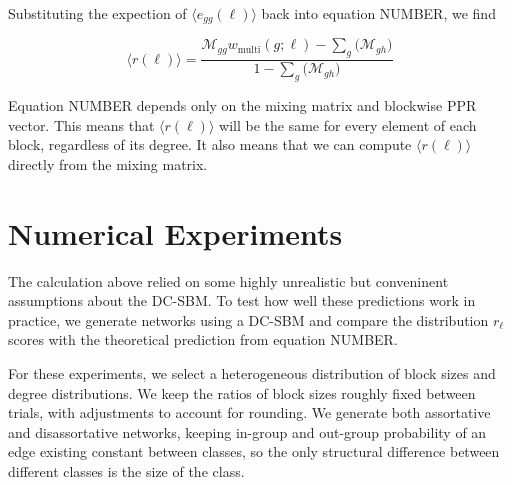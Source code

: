 \documentclass[12pt]{article}
\begin{document}
Substituting the expection of $\langle e_{gg}(\ell)\rangle$ back into equation NUMBER, we find

\begin{equation}
  \langle r(\ell) \rangle = \frac{\mathcal{M}_{gg} w_\text{multi}(g; \ell) - \sum_g \big( \mathcal{M}_{gh} \big)}{1 - \sum_g \big( \mathcal{M}_{gh} \big)}
\end{equation}

Equation NUMBER depends only on the mixing matrix and blockwise PPR vector.  This means that $\langle r(\ell) \rangle$ will be the same for every element of each block, regardless of its degree.  It also means that we can compute $\langle r(\ell) \rangle$ directly from the mixing matrix.

\section{Numerical Experiments}
The calculation above relied on some highly unrealistic but conveninent assumptions about the DC-SBM.  To test how well these predictions work in practice, we generate networks using a DC-SBM and compare the distribution $r_\ell$ scores with the theoretical prediction from equation NUMBER.

For these experiments, we select a heterogeneous distribution of block sizes and degree distributions.  We keep the ratios of block sizes roughly fixed between trials, with adjustments to account for rounding.  We generate both assortative and disassortative networks, keeping in-group and out-group probability of an edge existing constant between classes, so the only structural difference between different classes is the size of the class. 
\end{document}
